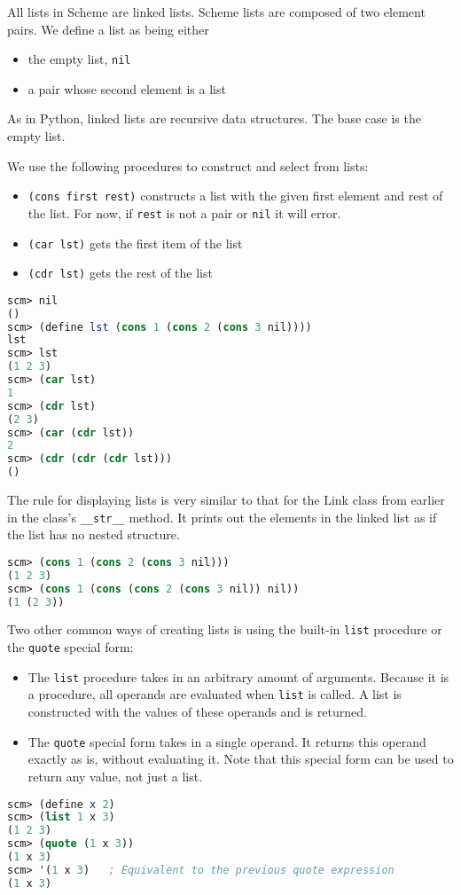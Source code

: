 All lists in Scheme are linked lists. Scheme lists are composed of two element pairs.
We define a list as being either

\begin{itemize}
\item the empty list, \texttt{nil}
\item a pair whose second element is a list
\end{itemize}

As in Python, linked lists are recursive data structures. The base case is the empty list.

We use the following procedures to construct and select from lists:
\begin{itemize}
\item {\tt (cons first rest)} constructs a list with the given first element
and rest of the list. For now, if \texttt{rest} is not a pair or \texttt{nil} it will error.
\item {\tt (car lst)} gets the first item of the list
\item {\tt (cdr lst)} gets the rest of the list
\end{itemize}

\begin{lstlisting}[language=Scheme]
scm> nil
()
scm> (define lst (cons 1 (cons 2 (cons 3 nil))))
lst
scm> lst
(1 2 3)
scm> (car lst)
1
scm> (cdr lst)
(2 3)
scm> (car (cdr lst))
2
scm> (cdr (cdr (cdr lst)))
()
\end{lstlisting}

The rule for displaying lists is very similar to that for the Link class from earlier in the class's \texttt{\_\_str\_\_} method. It prints out the elements in the linked list as if the list has no nested structure.

\begin{lstlisting}[language=Scheme]
scm> (cons 1 (cons 2 (cons 3 nil)))
(1 2 3)
scm> (cons 1 (cons (cons 2 (cons 3 nil)) nil))
(1 (2 3))
\end{lstlisting}

Two other common ways of creating lists is using the built-in \texttt{list}
procedure or the \texttt{quote} special form:

\begin{itemize}
\item The \texttt{list} procedure takes in an arbitrary amount of arguments.
Because it is a procedure, all operands are evaluated when \texttt{list} is
called. A list is constructed with the values of these operands and is
returned.
\item The \texttt{quote} special form takes in a single operand. It returns
this operand exactly as is, without evaluating it. Note that this special form
can be used to return any value, not just a list.
\end{itemize}

\begin{lstlisting}[language=Scheme]
scm> (define x 2)
scm> (list 1 x 3)
(1 2 3)
scm> (quote (1 x 3))
(1 x 3)
scm> '(1 x 3)   ; Equivalent to the previous quote expression
(1 x 3)
\end{lstlisting}

